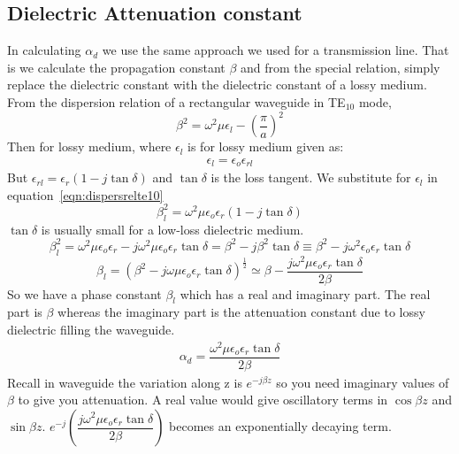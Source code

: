\subsection{Dielectric Attenuation constant}
In calculating  $\alpha_{d}$ we use the same approach we used for a transmission line. That is we calculate the propagation constant $\beta$ and from the special relation, simply replace the dielectric constant with the dielectric constant of a lossy medium. From the dispersion relation of a rectangular waveguide in TE$_{10}$ mode,
\begin{equation}
\beta^{2} = \omega^{2}\mu\epsilon_{l} -\left(\frac{\pi}{a}\right)^{2}
\label{eqn:dispersrelte10}
\end{equation}
Then for lossy medium, where $\epsilon_{l}$ is for lossy medium given as:
\begin{align*}
\epsilon_{l} = \epsilon_{o}\epsilon_{rl}
\end{align*}
But $\epsilon_{rl} = \epsilon_{r}(1-j\tan\delta)$ and $\tan\delta$ is the loss tangent. We substitute for $\epsilon_{l}$ in equation~\ref{eqn:dispersrelte10} 
\begin{equation*}
\beta^{2}_{l} = \omega^{2}\mu\epsilon_{o}\epsilon_{r}(1-j\tan\delta)
\end{equation*}
$\tan\delta$ is usually small for a low-loss dielectric medium.
\begin{dmath*}
\beta^{2}_{l} = \omega^{2}\mu\epsilon_{o}\epsilon_{r} - j\omega^{2}\mu\epsilon_{o}\epsilon_{r}\tan\delta = \beta^{2} - j\beta^{2}\tan\delta \equiv \beta^{2} - j\omega^{2}\epsilon_{o}\epsilon_{r}\tan\delta
\end{dmath*}
\begin{dmath}
\beta_{l} = (\beta^{2} - j\omega\mu\epsilon_{o}\epsilon_{r}\tan\delta)^{\frac{1}{2}} \simeq \beta - \dfrac{j\omega^{2}\mu\epsilon_{o}\epsilon_{r}\tan\delta}{2\beta}
\end{dmath}
So we have a phase constant $\beta_{l}$ which has a real and imaginary part. The real part is $\beta$ whereas the imaginary part is the attenuation constant due to lossy dielectric filling the waveguide.
\begin{align}
\alpha_{d} = \dfrac{\omega^{2}\mu\epsilon_{o}\epsilon_{r}\tan\delta}{2\beta}
\end{align}
Recall in waveguide the variation along z is $e^{-j\beta z}$ so you need imaginary values of $\beta$ to give you attenuation. A real value would give oscillatory terms in $\cos\beta z$ and $\sin\beta z$. $e^{-j}(\dfrac{j\omega^{2} \mu\epsilon_{o}\epsilon_{r}\tan\delta}{2\beta})$ becomes an exponentially decaying term.

